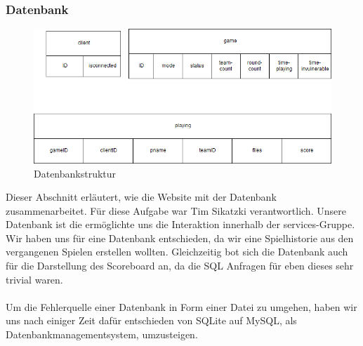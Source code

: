 \subsubsection{Datenbank}
\begin{figure}[htb]
	\begin{center}
		\includegraphics[width=0.8 \textwidth]{Databasestrucb.png}
		\caption{Datenbankstruktur}
		\label{fig:database}
	\end{center}
\end{figure}
Dieser Abschnitt erläutert, wie die Website mit der Datenbank zusammenarbeitet. Für diese Aufgabe war Tim Sikatzki verantwortlich.
Unsere Datenbank ist die ermöglichte uns die Interaktion innerhalb der services-Gruppe. Wir haben uns für eine Datenbank entschieden, da wir eine Spielhistorie aus den vergangenen Spielen erstellen wollten. Gleichzeitig bot sich die Datenbank auch für die Darstellung des Scoreboard an, da die SQL Anfragen für eben dieses sehr trivial waren.\\\\
Um die Fehlerquelle einer Datenbank in Form einer Datei zu umgehen, haben wir uns nach einiger Zeit dafür entschieden von SQLite auf MySQL, als Datenbankmanagementsystem, umzusteigen.\\\\

